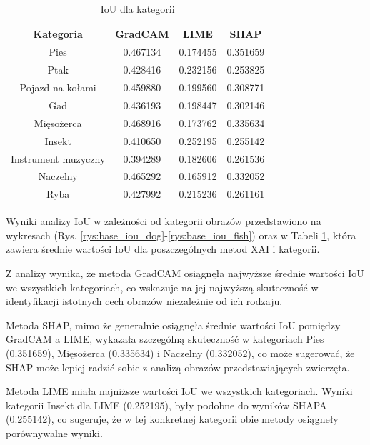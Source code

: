 \begin{table}
	\centering
	\begin{tabular}{|c|c|c|c|}
		\hline
		\textbf{Kategoria}  & \textbf{GradCAM} & \textbf{LIME} & \textbf{SHAP} \\
		\hline
		Pies                & 0.467134         & 0.174455      & 0.351659      \\
		\hline
		Ptak                & 0.428416         & 0.232156      & 0.253825      \\
		\hline
		Pojazd na kołami    & 0.459880         & 0.199560      & 0.308771      \\
		\hline
		Gad                 & 0.436193         & 0.198447      & 0.302146      \\
		\hline
		Mięsożerca          & 0.468916         & 0.173762      & 0.335634      \\
		\hline
		Insekt              & 0.410650         & 0.252195      & 0.255142      \\
		\hline
		Instrument muzyczny & 0.394289         & 0.182606      & 0.261536      \\
		\hline
		Naczelny            & 0.465292         & 0.165912      & 0.332052      \\
		\hline
		Ryba                & 0.427992         & 0.215236      & 0.261161      \\
		\hline
	\end{tabular}
	\caption{IoU dla kategorii}
	\label{tab:base_iou_category}
\end{table}

Wyniki analizy IoU w zależności od kategorii obrazów przedstawiono na wykresach (Rys. \ref{rys:base_iou_dog}-\ref{rys:base_iou_fish}) oraz w Tabeli \ref{tab:base_iou_category}, która zawiera średnie wartości IoU dla poszczególnych metod XAI i kategorii.

Z analizy wynika, że metoda GradCAM osiągnęła najwyższe średnie wartości IoU we wszystkich kategoriach, co wskazuje na jej najwyższą skuteczność w identyfikacji istotnych cech obrazów niezależnie od ich rodzaju.

Metoda SHAP, mimo że generalnie osiągnęła średnie wartości IoU pomiędzy GradCAM a LIME, wykazała szczególną skuteczność w kategoriach Pies (0.351659), Mięsożerca (0.335634) i Naczelny (0.332052), co może sugerować, że SHAP może lepiej radzić sobie z analizą obrazów przedstawiających zwierzęta.

Metoda LIME miała najniższe wartości IoU we wszystkich kategoriach.
Wyniki kategorii Insekt dla LIME (0.252195), były podobne do wyników SHAPA (0.255142), co sugeruje, że w tej konkretnej kategorii obie metody osiągneły porównywalne wyniki.

